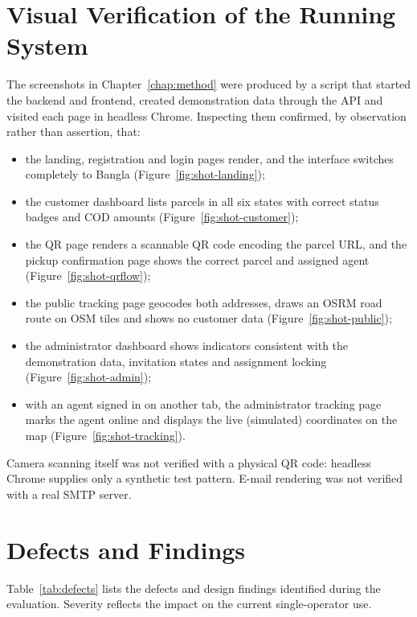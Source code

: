 \section{Visual Verification of the Running System}
\label{sec:visual}

The screenshots in Chapter~\ref{chap:method} were produced by a script that started the backend and frontend, created demonstration data through the API and visited each page in headless Chrome. Inspecting them confirmed, by observation rather than assertion, that:
\begin{itemize}
  \item the landing, registration and login pages render, and the interface switches completely to Bangla (Figure~\ref{fig:shot-landing});
  \item the customer dashboard lists parcels in all six states with correct status badges and COD amounts (Figure~\ref{fig:shot-customer});
  \item the QR page renders a scannable QR code encoding the parcel URL, and the pickup confirmation page shows the correct parcel and assigned agent (Figure~\ref{fig:shot-qrflow});
  \item the public tracking page geocodes both addresses, draws an OSRM road route on OSM tiles and shows no customer data (Figure~\ref{fig:shot-public});
  \item the administrator dashboard shows indicators consistent with the demonstration data, invitation states and assignment locking (Figure~\ref{fig:shot-admin});
  \item with an agent signed in on another tab, the administrator tracking page marks the agent online and displays the live (simulated) coordinates on the map (Figure~\ref{fig:shot-tracking}).
\end{itemize}

Camera scanning itself was not verified with a physical QR code: headless Chrome supplies only a synthetic test pattern. E-mail rendering was not verified with a real SMTP server.

\section{Defects and Findings}
\label{sec:defects}

Table~\ref{tab:defects} lists the defects and design findings identified during the evaluation. Severity reflects the impact on the current single-operator use.

